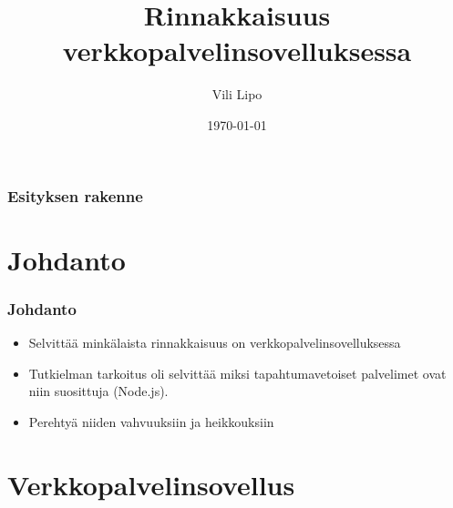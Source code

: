 \documentclass{beamer}
\title{Rinnakkaisuus verkkopalvelinsovelluksessa}
\author{Vili Lipo}
\institute{Helsingin Yliopisto}
\date{\today}
\begin{document}
\begin{frame}
\titlepage
\end{frame}
\begin{frame}
\frametitle{Esityksen rakenne}
\tableofcontents
\end{frame}
\section{Johdanto}
\begin{frame}
\frametitle{Johdanto}
\begin{itemize}
 \item Selvittää minkälaista rinnakkaisuus on verkkopalvelinsovelluksessa
 \item Tutkielman tarkoitus oli selvittää miksi tapahtumavetoiset palvelimet
 ovat niin suosittuja (Node.js).
 \item Perehtyä niiden vahvuuksiin ja heikkouksiin
 \end{itemize}
\end{frame}
\section{Verkkopalvelinsovellus}
\end{document}
